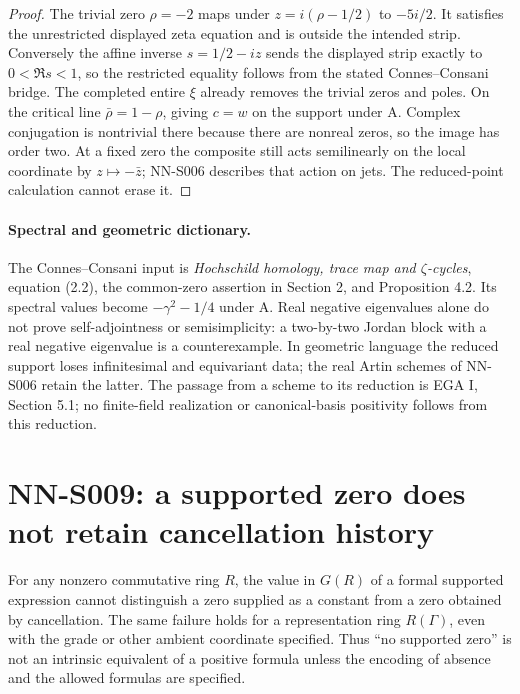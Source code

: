\begin{proof}
The trivial zero $\rho=-2$ maps under $z=i(\rho-1/2)$ to
$-5i/2$. It satisfies the unrestricted displayed zeta equation
and is outside the intended strip. Conversely the affine inverse
$s=1/2-iz$ sends the displayed strip exactly to $0<\Re s<1$,
so the restricted equality follows from the stated Connes--Consani
bridge. The completed entire $\xi$ already removes the trivial
zeros and poles. On the critical line $\bar\rho=1-\rho$, giving
$c=w$ on the support under A. Complex conjugation is nontrivial
there because there are nonreal zeros, so the image has order two.
At a fixed zero the composite still acts semilinearly on the
local coordinate by $z\mapsto-\bar z$; NN-S006 describes that
action on jets. The reduced-point calculation cannot erase it.
\end{proof}

\paragraph{Spectral and geometric dictionary.}
The Connes--Consani input is \emph{Hochschild homology, trace map
and $\zeta$-cycles}, equation (2.2), the common-zero assertion in
Section 2, and Proposition 4.2. Its spectral values become
$-\gamma^2-1/4$ under A. Real negative eigenvalues alone do not
prove self-adjointness or semisimplicity: a two-by-two Jordan
block with a real negative eigenvalue is a counterexample.
In geometric language the reduced support loses infinitesimal
and equivariant data; the real Artin schemes of NN-S006 retain
the latter. The passage from a scheme to its reduction is EGA I,
Section 5.1; no finite-field realization or canonical-basis
positivity follows from this reduction.



\section{NN-S009: a supported zero does not retain cancellation history}
\label{sec:NN-S009}

\begin{theorem}[NN-S009]
For any nonzero commutative ring $R$, the value in $G(R)$ of a
formal supported expression cannot distinguish a zero supplied
as a constant from a zero obtained by cancellation. The same
failure holds for a representation ring $R(\Gamma)$, even with
the grade or other ambient coordinate specified. Thus
``no supported zero'' is not an intrinsic equivalent of a
positive formula unless the encoding of absence and the allowed
formulas are specified.
\end{theorem}

